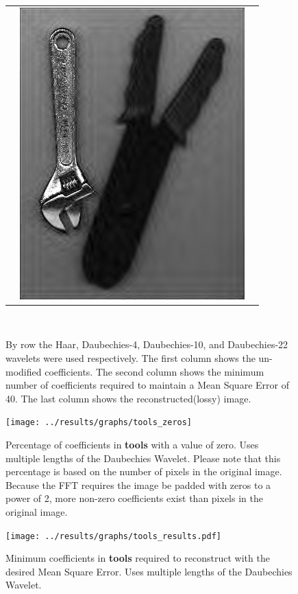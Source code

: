 \begin{figure}[hbt]
\begin{tabular}{ S @{} S @{} S }
		&	\includegraphics[height=0.25\textwidth]{../images/tools_d22_final} \\
	\end{tabular} \\
	\caption{By row the Haar, Daubechies-4, Daubechies-10, and Daubechies-22 wavelets were used 
					 respectively. The first
					 column shows the un-modified coefficients.  The second column shows the minimum number
					 of coefficients required to maintain a Mean Square Error of 40.
					 The last column shows the reconstructed(lossy) image.}
\end{figure}


\begin{figure}[hbt]
	\centering
	\label{fig:tools_zeros}
		\texttt{[image: ../results/graphs/tools\_zeros]}
	\caption{Percentage of coefficients in {\bf tools} with a value of zero. Uses multiple lengths of the Daubechies Wavelet.  Please note that this percentage is based on the number of pixels in the original image.  Because the FFT requires the image be padded with zeros to a power of 2, more non-zero coefficients exist than pixels in the original image.  }
\end{figure}
\begin{figure}[hbt]
	\centering
	\label{fig:tools_stats}
		\texttt{[image: ../results/graphs/tools\_results.pdf]}
	\caption{Minimum coefficients in {\bf tools} required to reconstruct with the desired Mean Square Error. Uses multiple lengths of the Daubechies Wavelet. }
\end{figure}



\FloatBarrier

